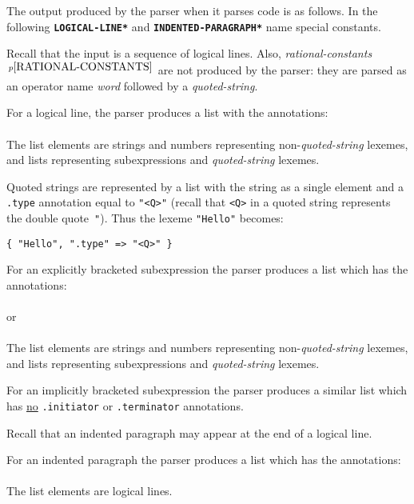 \documentclass[12pt]{article}
\newcommand{\ttkey}[1]{{\tt \bfseries #1}}
\newcommand{\pagnote}[1]{$\,^{p\pageref{#1}}$}
\begin{document}
The output produced by the parser when it parses code is as
follows.  In the following \ttkey{*LOGICAL-LINE*} and
\ttkey{*INDENTED-PARAGRAPH*} name special constants.

Recall that the input is a sequence of logical lines.  Also,
{\em rational-constants}\pagnote{RATIONAL-CONSTANTS}
are not produced by the parser: they are parsed as an operator
name {\em word} followed by a {\em quoted-string}.

For a logical line, the parser produces a list with the
annotations: \\
\hspace*{0.5in}{\tt ".initiator" => *LOGICAL-LINE*, ".terminator" => "<LF>"} \\
The list elements are strings and numbers representing non-{\em quoted-string}
lexemes, and lists representing subexpressions and {\em quoted-string} lexemes.

Quoted strings are represented by a list with the string as a single element
and a {\tt .type} annotation equal to {\tt "<Q>"}
(recall that {\tt <Q>} in a quoted string represents the double quote~{\tt "}).
Thus the lexeme {\tt "Hello"} becomes: \\
\centerline{\tt \{ "Hello", ".type" => "<Q>" \} }

For an explicitly bracketed subexpression the parser produces a list which has
the annotations: \\
\hspace*{0.5in}{\tt ".initiator" => "(", ".terminator" => ")"} \\
or \\
\hspace*{0.5in}{\tt ".initiator" => "[", ".terminator" => "]"} \\
The list elements are strings and numbers representing non-{\em quoted-string}
lexemes, and lists representing subexpressions and {\em quoted-string} lexemes.

For an implicitly bracketed subexpression the parser produces a similar
list which has
\underline{no} {\tt .initiator} or {\tt .terminator} annotations.

Recall that an indented paragraph may appear at the end of a logical line.

For an indented paragraph the parser produces a list
which has the annotations: \\
\hspace*{0.5in}{\tt ".initiator" => ":",
                    ".terminator" => *INDENTED-PARAGRAPH*} \\
The list elements are logical lines.
\end{document}
